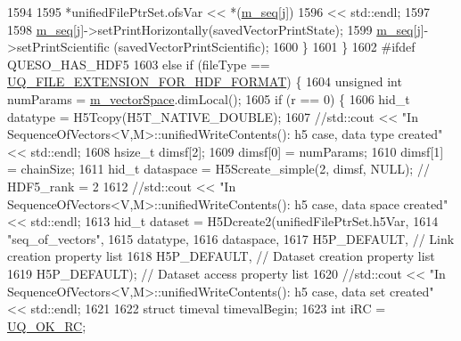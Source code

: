 \begin{DoxyCode}
1594 
1595               *unifiedFilePtrSet.ofsVar << *(\hyperlink{class_q_u_e_s_o_1_1_sequence_of_vectors_ae83e7c53439265667809256d0d302e5b}{m\_seq}[j])
1596                                         << std::endl;
1597 
1598               \hyperlink{class_q_u_e_s_o_1_1_sequence_of_vectors_ae83e7c53439265667809256d0d302e5b}{m\_seq}[j]->setPrintHorizontally(savedVectorPrintState);
1599               \hyperlink{class_q_u_e_s_o_1_1_sequence_of_vectors_ae83e7c53439265667809256d0d302e5b}{m\_seq}[j]->setPrintScientific  (savedVectorPrintScientific);
1600             \}
1601           \}
1602 \textcolor{preprocessor}{#ifdef QUESO\_HAS\_HDF5}
1603 \textcolor{preprocessor}{}          \textcolor{keywordflow}{else} \textcolor{keywordflow}{if} (fileType == \hyperlink{_defines_8h_a4ebcc075277d031eb97c90b9a45f4493}{UQ\_FILE\_EXTENSION\_FOR\_HDF\_FORMAT}) \{
1604             \textcolor{keywordtype}{unsigned} \textcolor{keywordtype}{int} numParams = \hyperlink{class_q_u_e_s_o_1_1_base_vector_sequence_a4bd171e39ed050ff105c808336f35198}{m\_vectorSpace}.dimLocal();
1605             \textcolor{keywordflow}{if} (r == 0) \{
1606               hid\_t datatype = H5Tcopy(H5T\_NATIVE\_DOUBLE);
1607               \textcolor{comment}{//std::cout << "In SequenceOfVectors<V,M>::unifiedWriteContents(): h5 case, data type
       created" << std::endl;}
1608               hsize\_t dimsf[2];
1609               dimsf[0] = numParams;
1610               dimsf[1] = chainSize;
1611               hid\_t dataspace = H5Screate\_simple(2, dimsf, NULL); \textcolor{comment}{// HDF5\_rank = 2}
1612               \textcolor{comment}{//std::cout << "In SequenceOfVectors<V,M>::unifiedWriteContents(): h5 case, data space
       created" << std::endl;}
1613               hid\_t dataset = H5Dcreate2(unifiedFilePtrSet.h5Var,
1614                                          \textcolor{stringliteral}{"seq\_of\_vectors"},
1615                                          datatype,
1616                                          dataspace,
1617                                          H5P\_DEFAULT,  \textcolor{comment}{// Link creation property list}
1618                                          H5P\_DEFAULT,  \textcolor{comment}{// Dataset creation property list}
1619                                          H5P\_DEFAULT); \textcolor{comment}{// Dataset access property list }
1620               \textcolor{comment}{//std::cout << "In SequenceOfVectors<V,M>::unifiedWriteContents(): h5 case, data set created"
       << std::endl;}
1621 
1622               \textcolor{keyword}{struct }timeval timevalBegin;
1623               \textcolor{keywordtype}{int} iRC = \hyperlink{namespace_q_u_e_s_o_a8e909502900aecf24cedba022ea84471}{UQ\_OK\_RC};

\end{DoxyCode}
